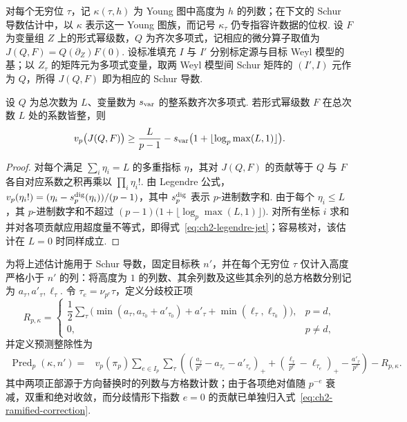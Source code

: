 对每个无穷位 $\tau$，记 $\kappa(\tau,h)$ 为 Young 图中高度为 $h$ 的列数；在下文的 Schur 导数估计中，以 $\kappa$ 表示这一 Young 图族，而记号 $\kappa_\tau$ 仍专指容许数据的位权. 设 $F$ 为变量组 $Z$ 上的形式幂级数，$Q$ 为齐次多项式，记相应的微分算子取值为 $J(Q,F)=Q(\partial_Z)F(0)$. 设标准填充 $I$ 与 $I'$ 分别标定源与目标 Weyl 模型的基；以 $Z_\tau$ 的矩阵元为多项式变量，取两 Weyl 模型间 Schur 矩阵的 $(I',I)$ 元作为 $Q$，所得 $J(Q,F)$ 即为相应的 Schur 导数.

\begin{lemma}[齐次导数的阶乘估计]
\label{lem:ch2-legendre-jet}
设 $Q$ 为总次数为 $L$、变量数为 $s_{\rm var}$ 的整系数齐次多项式. 若形式幂级数 $F$ 在总次数 $L$ 处的系数皆整，则
\begin{equation}
\label{eq:ch2-legendre-jet}
 v_p\bigl(J(Q,F)\bigr)\ge
 \frac{L}{p-1}-s_{\rm var}\bigl(1+\lfloor\log_p\max(L,1)\rfloor\bigr).
\end{equation}
\end{lemma}

\begin{proof}
对每个满足 $\sum_i\eta_i=L$ 的多重指标 $\eta$，其对 $J(Q,F)$ 的贡献等于 $Q$ 与 $F$ 各自对应系数之积再乘以 $\prod_i\eta_i!$. 由 Legendre 公式，$v_p(\eta_i!)=(\eta_i-s_p^{\rm dig}(\eta_i))/(p-1)$，其中 $s_p^{\rm dig}$ 表示 $p$-进制数字和. 由于每个 $\eta_i\le L$，其 $p$-进制数字和不超过 $(p-1)\bigl(1+\lfloor\log_p\max(L,1)\rfloor\bigr)$. 对所有坐标 $i$ 求和并对各项贡献应用超度量不等式，即得式~\eqref{eq:ch2-legendre-jet}；容易核对，该估计在 $L=0$ 时同样成立.
\end{proof}

为将上述估计施用于 Schur 导数，固定目标秩 $n'$，并在每个无穷位 $\tau$ 仅计入高度严格小于 $n'$ 的列：将高度为 $1$ 的列数、其余列数及这些其余列的总方格数分别记为 $a_\tau,a'_\tau,\ell_\tau$. 令 $\tau_e=\nu_{p^e}\tau$，定义分歧校正项
\begin{equation}
\label{eq:ch2-ramified-correction}
 R_{p,\kappa}
 =\begin{cases}
 \dfrac12\displaystyle\sum_\tau
 \bigl(\min(a_\tau,a_{\tau_0}+a'_{\tau_0})+a'_\tau+
                 \min(\ell_\tau,\ell_{\tau_0})\bigr),&p=d,\\[4pt]
 0,&p\ne d,
 \end{cases}
\end{equation}
并定义预测整除性为
\begin{equation}
\label{eq:ch2-predicted-divisibility}
\begin{aligned}
 \operatorname{Pred}_p(\kappa,n')={}&v_p(\pi_p)\sum_{e\in I_p}\sum_\tau
    \left(
      \left(\frac{a_\tau}{p^e}-a_{\tau_e}-a'_{\tau_e}\right)_+
     +\left(\frac{\ell_\tau}{p^e}-\ell_{\tau_e}\right)_+
     -\frac{a'_\tau}{p^e}
    \right)-R_{p,\kappa}.
\end{aligned}
\end{equation}
其中两项正部源于方向替换时的列数与方格数计数；由于各项绝对值随 $p^{-e}$ 衰减，双重和绝对收敛，而分歧情形下指数 $e=0$ 的贡献已单独归入式~\eqref{eq:ch2-ramified-correction}.

